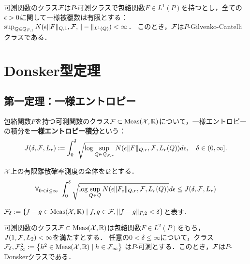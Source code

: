 \documentclass[uplatex,dvipdfmx]{jsreport}
\begin{document}
\begin{theorem}\label{thm-Glivenko-Cantelli-2}
    可測関数のクラス$\mathcal{F}$は$P$-可測クラスで包絡関数$F\in L^1(P)$を持つとし，全ての$\epsilon>0$に関して一様被覆数は有限とする：$\sup_{Q\in Q_{F,1}}N(\epsilon\|F\|_{Q,1},\mathcal{F},\|-\|_{L^1(Q)})<\infty$．
    このとき，$\mathcal{F}$は$P$-Gilvenko-Cantelliクラスである．
\end{theorem}

\section{Donsker型定理}

\begin{tcolorbox}[colframe=ForestGreen, colback=ForestGreen!10!white,breakable,colbacktitle=ForestGreen!40!white,coltitle=black,fonttitle=\bfseries\sffamily,
title=11/8/2021]
    
\end{tcolorbox}

\subsection{第一定理：一様エントロピー}

\begin{definition}
    包絡関数$F$を持つ可測関数のクラス$\mathcal{F}\subset\mathrm{Meas}(\mathcal{X},\mathbb{R})$について，一様エントロピーの積分を\textbf{一様エントロピー積分}という：
    \[J(\delta,\mathcal{F},L_r):=\int^\delta_0\sqrt{\log\sup_{Q\in\mathcal{Q}_{F,r}}N(\epsilon\|F\|_{Q,r},\mathcal{F},L_r(Q))}d\epsilon,\quad\delta\in(0,\infty].\]
\end{definition}

\begin{lemma}
    $\mathcal{X}$上の有限離散確率測度の全体を$\mathcal{Q}$とする．
    \[\forall_{0<\delta\le\infty}\;\int^\delta_0\sqrt{\log\sup_{Q\in\mathcal{Q}}N(\epsilon\|F_c\|_{Q,r},\mathcal{F},L_r(Q))}d\epsilon\le J(\delta,\mathcal{F},L_r)\]
\end{lemma}

\begin{notation}
    $\mathcal{F}_\delta:=\left\{f-g\in\mathrm{Meas}(\mathcal{X},\mathbb{R})\mid f,g\in\mathcal{F},\|f-g\|_{P,2}<\delta\right\}$と表す．
\end{notation}

\begin{theorem}\label{thm-Donsker-1}
    可測関数のクラス$\mathcal{F}\subset\mathrm{Meas}(\mathcal{X},\mathbb{R})$は包絡関数$F\in L^2(P)$をもち，$J(1,\mathcal{F},L_2)<\infty$を満たすとする．
    任意の$0<\delta\le\infty$について，クラス$\mathcal{F}_\delta,\mathcal{F}^2_\infty:=\left\{h^2\in\mathrm{Meas}(\mathcal{X},\mathbb{R})\mid h\in\mathcal{F}_\infty\right\}$
    は$P$-可測とする．このとき，$\mathcal{F}$は$P$-Donskerクラスである．
\end{theorem}
\end{document}
